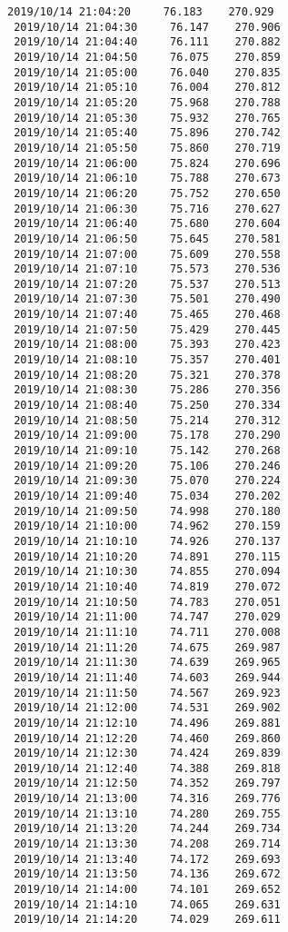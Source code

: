 \documentclass[11pt]{article}
\begin{document}
\begin{Verbatim}[commandchars=\\\{\}]
 2019/10/14 21:04:20     76.183    270.929
 2019/10/14 21:04:30     76.147    270.906
 2019/10/14 21:04:40     76.111    270.882
 2019/10/14 21:04:50     76.075    270.859
 2019/10/14 21:05:00     76.040    270.835
 2019/10/14 21:05:10     76.004    270.812
 2019/10/14 21:05:20     75.968    270.788
 2019/10/14 21:05:30     75.932    270.765
 2019/10/14 21:05:40     75.896    270.742
 2019/10/14 21:05:50     75.860    270.719
 2019/10/14 21:06:00     75.824    270.696
 2019/10/14 21:06:10     75.788    270.673
 2019/10/14 21:06:20     75.752    270.650
 2019/10/14 21:06:30     75.716    270.627
 2019/10/14 21:06:40     75.680    270.604
 2019/10/14 21:06:50     75.645    270.581
 2019/10/14 21:07:00     75.609    270.558
 2019/10/14 21:07:10     75.573    270.536
 2019/10/14 21:07:20     75.537    270.513
 2019/10/14 21:07:30     75.501    270.490
 2019/10/14 21:07:40     75.465    270.468
 2019/10/14 21:07:50     75.429    270.445
 2019/10/14 21:08:00     75.393    270.423
 2019/10/14 21:08:10     75.357    270.401
 2019/10/14 21:08:20     75.321    270.378
 2019/10/14 21:08:30     75.286    270.356
 2019/10/14 21:08:40     75.250    270.334
 2019/10/14 21:08:50     75.214    270.312
 2019/10/14 21:09:00     75.178    270.290
 2019/10/14 21:09:10     75.142    270.268
 2019/10/14 21:09:20     75.106    270.246
 2019/10/14 21:09:30     75.070    270.224
 2019/10/14 21:09:40     75.034    270.202
 2019/10/14 21:09:50     74.998    270.180
 2019/10/14 21:10:00     74.962    270.159
 2019/10/14 21:10:10     74.926    270.137
 2019/10/14 21:10:20     74.891    270.115
 2019/10/14 21:10:30     74.855    270.094
 2019/10/14 21:10:40     74.819    270.072
 2019/10/14 21:10:50     74.783    270.051
 2019/10/14 21:11:00     74.747    270.029
 2019/10/14 21:11:10     74.711    270.008
 2019/10/14 21:11:20     74.675    269.987
 2019/10/14 21:11:30     74.639    269.965
 2019/10/14 21:11:40     74.603    269.944
 2019/10/14 21:11:50     74.567    269.923
 2019/10/14 21:12:00     74.531    269.902
 2019/10/14 21:12:10     74.496    269.881
 2019/10/14 21:12:20     74.460    269.860
 2019/10/14 21:12:30     74.424    269.839
 2019/10/14 21:12:40     74.388    269.818
 2019/10/14 21:12:50     74.352    269.797
 2019/10/14 21:13:00     74.316    269.776
 2019/10/14 21:13:10     74.280    269.755
 2019/10/14 21:13:20     74.244    269.734
 2019/10/14 21:13:30     74.208    269.714
 2019/10/14 21:13:40     74.172    269.693
 2019/10/14 21:13:50     74.136    269.672
 2019/10/14 21:14:00     74.101    269.652
 2019/10/14 21:14:10     74.065    269.631
 2019/10/14 21:14:20     74.029    269.611

\end{Verbatim}
\end{document}
